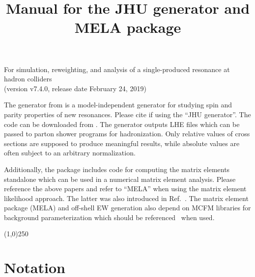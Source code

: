 \documentclass[aps,superscriptaddress,nofootinbib]{revtex4}
\begin{document}
\vspace{0.6cm}

\title{
\large
Manual for the JHU generator and MELA package
}
\maketitle
\begin{center}
\small
For simulation, reweighting, and analysis of a single-produced resonance at hadron colliders \\
(version v7.4.0, release date February 24, 2019) \\
\normalsize
\end{center}

\noindent
The generator from \cite{Gao:2010qx,Bolognesi:2012,Anderson:2013,Gritsan:2016} is a model-independent generator for studying spin and parity properties of new resonances.
Please cite \cite{Gao:2010qx,Bolognesi:2012,Anderson:2013,Gritsan:2016} if using the ``JHU generator''.
The code can be downloaded from \cite{thesite}.
The generator outputs LHE files which can be passed to parton shower programs for hadronization.
Only relative values of cross sections are supposed to produce meaningful results, while absolute values are often subject to an arbitrary normalization.

Additionally, the package includes code for computing the matrix elements standalone which can be used in a numerical matrix element analysis.
Please reference the above papers and refer to ``MELA'' when using the matrix element likelihood approach.
The latter was also introduced in Ref.~\cite{Chatrchyan:2012ufa}. The matrix element package (MELA) and off-shell EW generation also depend on MCFM libraries for background parameterization which should be referenced~\cite{Campbell:2010ff} when used.

\vspace{0.5cm}
\begin{center}
\line(1,0){250}
\end{center}
\vspace{0.5cm}
\tableofcontents
\begin{center}
\end{center}
\vspace{0.5cm}



\section{Notation}
\end{document}
